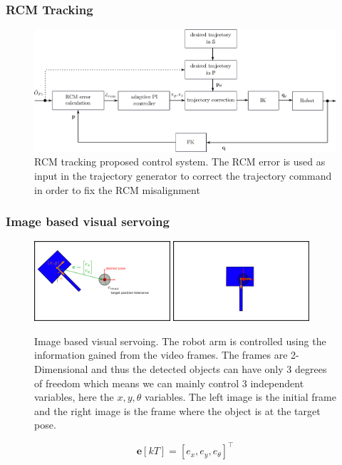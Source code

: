 \begin{frame}
\frametitle{RCM Tracking}
\begin{center}
\begin{figure}[!htb]
\centering
\includegraphics[width=\textwidth]{../images/rcm-system-control.png}
\caption{RCM tracking proposed control system. The RCM error is used as input in the trajectory generator to correct the trajectory command in order to fix the RCM misalignment}
\label{rcm-control-system-block-diagram}
\end{figure}
\end{center}
\end{frame}


\begin{frame}
\frametitle{Image based visual servoing}
\begin{center}
\begin{figure}[!htb]
\centering
\includegraphics[width=0.45\textwidth]{../images/visual_servo_start.png}
\includegraphics[width=0.45\textwidth]{../images/visual_servo_end.png}\\
\caption{Image based visual servoing. The robot arm is controlled using the information gained from the video frames. The frames are 2-Dimensional and thus 
the detected objects can have only 3 degrees of freedom which means we can mainly control 3 independent variables, here the $x,y,θ$ variables. The left image 
is the initial frame and the right image is the frame where the object is at the target pose.}
\label{image-based-servoing-start-end}
\end{figure}

\[
\mathbf{e}[kT] = [e_x, e_y, e_θ]^\top
\]
\end{center}
\end{frame}

